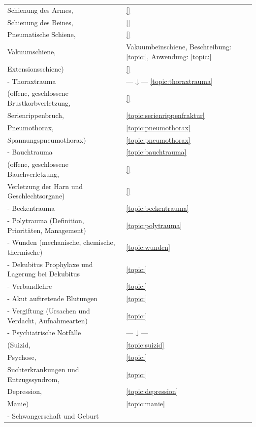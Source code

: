 \begin{xtabular}{p{10cm}p{5cm}}
Schienung des Armes,
& 
\ref{}\noindent{}
\\
Schienung des Beines,
& 
\ref{}\noindent{}
\\
Pneumatische Schiene,
& 
\ref{}\noindent{}
\\
Vakuumschiene,
& 
Vakuumbeinschiene, Beschreibung: \ref{topic:}, Anwendung: \ref{topic:}
\\
Extensionsschiene)
& 
\ref{}\noindent{}
\\
- Thoraxtrauma 
& 
--- ↓ --- \ref{topic:thoraxtrauma}
\\
(offene, geschlossene Brustkorbverletzung,
& 
\ref{}\noindent{}
\\
Serienrippenbruch,
& 
\ref{topic:serienrippenfraktur}
\\
Pneumothorax,
& 
\ref{topic:pneumothorax}
\\
Spannungspneumothorax)
& 
\ref{topic:pneumothorax}
\\
- Bauchtrauma 
& 
\ref{topic:bauchtrauma}
\\
(offene, geschlossene Bauchverletzung,
& 
\ref{}\noindent{}
\\
Verletzung der Harn und Geschlechtsorgane)
& 
\ref{}\noindent{}
\\
- Beckentrauma
& 
\ref{topic:beckentrauma}
\\
- Polytrauma (Definition, Prioritäten, Management)
& 
\ref{topic:polytrauma}
\\
- Wunden (mechanische, chemische, thermische)
& 
\ref{topic:wunden}
\\
- Dekubitus Prophylaxe und Lagerung bei Dekubitus
& 
\ref{topic:}\noindent{}
\\
- Verbandlehre
& 
\ref{topic:}\noindent{}
\\
- Akut auftretende Blutungen
& 
\ref{topic:}\noindent{}
\\
- Vergiftung (Ursachen und Verdacht, Aufnahmearten)
& 
\ref{topic:}\noindent{}
\\
- Psychiatrische Notfälle
& 
--- ↓ --- 
\\
(Suizid, 
& 
\ref{topic:suizid}
\\
Psychose,
& 
\ref{topic:}\noindent{}
\\
Suchterkrankungen und Entzugssyndrom,
& 
\ref{topic:}\noindent{}
\\
Depression, 
& 
\ref{topic:depression}
\\
Manie)
& 
\ref{topic:manie}
\\
- Schwangerschaft und Geburt 


\end{xtabular}

